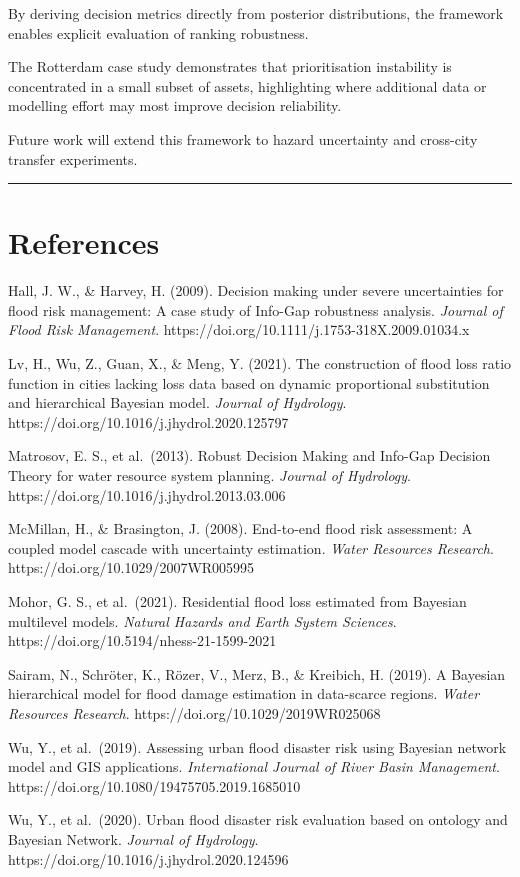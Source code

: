 \documentclass[
]{article}
\begin{document}
By deriving decision metrics directly from posterior distributions, the
framework enables explicit evaluation of ranking robustness.

The Rotterdam case study demonstrates that prioritisation instability is
concentrated in a small subset of assets, highlighting where additional
data or modelling effort may most improve decision reliability.

Future work will extend this framework to hazard uncertainty and
cross-city transfer experiments.

\begin{center}\rule{0.5\linewidth}{0.5pt}\end{center}

\section{References}\label{references}

Hall, J. W., \& Harvey, H. (2009). Decision making under severe
uncertainties for flood risk management: A case study of Info-Gap
robustness analysis. \emph{Journal of Flood Risk Management}.
https://doi.org/10.1111/j.1753-318X.2009.01034.x

Lv, H., Wu, Z., Guan, X., \& Meng, Y. (2021). The construction of flood
loss ratio function in cities lacking loss data based on dynamic
proportional substitution and hierarchical Bayesian model. \emph{Journal
of Hydrology}. https://doi.org/10.1016/j.jhydrol.2020.125797

Matrosov, E. S., et al.~(2013). Robust Decision Making and Info-Gap
Decision Theory for water resource system planning. \emph{Journal of
Hydrology}. https://doi.org/10.1016/j.jhydrol.2013.03.006

McMillan, H., \& Brasington, J. (2008). End-to-end flood risk
assessment: A coupled model cascade with uncertainty estimation.
\emph{Water Resources Research}. https://doi.org/10.1029/2007WR005995

Mohor, G. S., et al.~(2021). Residential flood loss estimated from
Bayesian multilevel models. \emph{Natural Hazards and Earth System
Sciences}. https://doi.org/10.5194/nhess-21-1599-2021

Sairam, N., Schröter, K., Rözer, V., Merz, B., \& Kreibich, H. (2019). A
Bayesian hierarchical model for flood damage estimation in data-scarce
regions. \emph{Water Resources Research}.
https://doi.org/10.1029/2019WR025068

Wu, Y., et al.~(2019). Assessing urban flood disaster risk using
Bayesian network model and GIS applications. \emph{International Journal
of River Basin Management}.
https://doi.org/10.1080/19475705.2019.1685010

Wu, Y., et al.~(2020). Urban flood disaster risk evaluation based on
ontology and Bayesian Network. \emph{Journal of Hydrology}.
https://doi.org/10.1016/j.jhydrol.2020.124596
\end{document}
